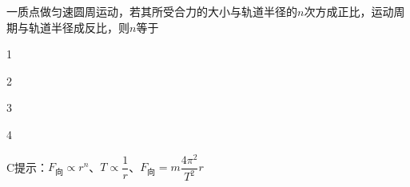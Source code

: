 一质点做匀速圆周运动，若其所受合力的大小与轨道半径的\(n\)次方成正比，运动周期与轨道半径成反比，则\(n\)等于\paren[]
\begin{choices}
	\item 1
	\item 2
	\item 3
	\item 4
\end{choices}
\begin{answer}
	C\qquad 提示：\(F_{\text{向}}\propto r^n\)、\(T\propto \dfrac{1}{r}\)、\(F_{\text{向}}=m \dfrac{4\pi^2}{T^2}r\)
\end{answer}